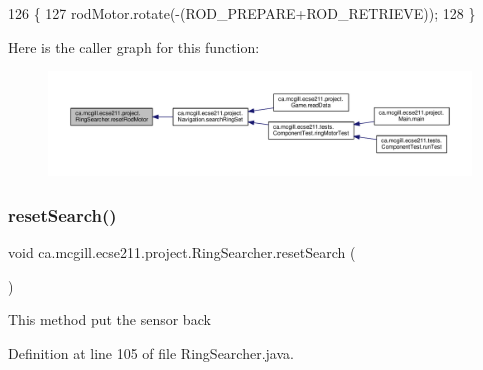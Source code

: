 \begin{DoxyCode}
126                               \{
127     rodMotor.rotate(-(ROD\_PREPARE+ROD\_RETRIEVE));
128   \}
\end{DoxyCode}
Here is the caller graph for this function\+:
\nopagebreak
\begin{figure}[H]
\begin{center}
\leavevmode
\includegraphics[width=350pt]{classca_1_1mcgill_1_1ecse211_1_1project_1_1_ring_searcher_a8b0ea0bf4cd07b6c8a090c3e9bc8eb04_icgraph}
\end{center}
\end{figure}
\mbox{\label{classca_1_1mcgill_1_1ecse211_1_1project_1_1_ring_searcher_ad73c50b29163d91292de418101cce21e}} 
\subsubsection{\texorpdfstring{reset\+Search()}{resetSearch()}}
{\footnotesize\ttfamily void ca.\+mcgill.\+ecse211.\+project.\+Ring\+Searcher.\+reset\+Search (\begin{DoxyParamCaption}{ }\end{DoxyParamCaption})}

This method put the sensor back 

Definition at line 105 of file Ring\+Searcher.\+java.


